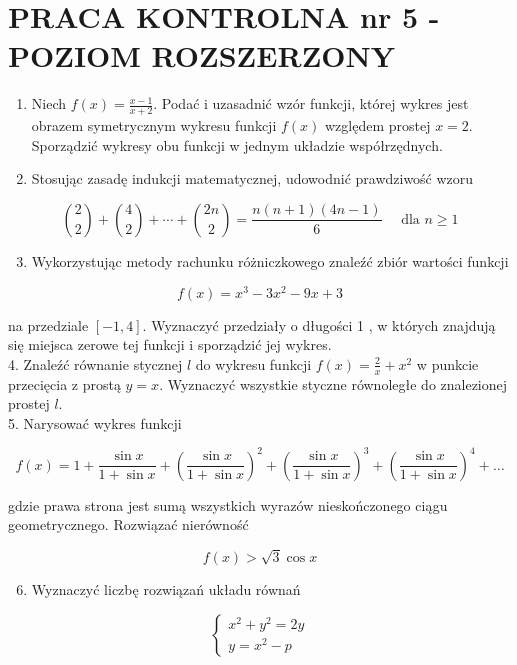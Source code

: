 \documentclass[10pt]{article}
\begin{document}
\section*{PRACA KONTROLNA nr 5 - POZIOM ROZSZERZONY}
\begin{enumerate}
  \item Niech $f(x)=\frac{x-1}{x+2}$. Podać i uzasadnić wzór funkcji, której wykres jest obrazem symetrycznym wykresu funkcji $f(x)$ względem prostej $x=2$. Sporządzić wykresy obu funkcji w jednym układzie współrzędnych.
  \item Stosując zasadę indukcji matematycznej, udowodnić prawdziwość wzoru
\end{enumerate}

$$
\binom{2}{2}+\binom{4}{2}+\cdots+\binom{2 n}{2}=\frac{n(n+1)(4 n-1)}{6} \quad \text { dla } n \geqslant 1
$$

\begin{enumerate}
  \setcounter{enumi}{2}
  \item Wykorzystując metody rachunku różniczkowego znaleźć zbiór wartości funkcji
\end{enumerate}

$$
f(x)=x^{3}-3 x^{2}-9 x+3
$$

na przedziale $[-1,4]$. Wyznaczyć przedziały o długości 1 , w których znajdują się miejsca zerowe tej funkcji i sporządzić jej wykres.\\
4. Znaleźć równanie stycznej $l$ do wykresu funkcji $f(x)=\frac{2}{x}+x^{2}$ w punkcie przecięcia z prostą $y=x$. Wyznaczyć wszystkie styczne równoległe do znalezionej prostej $l$.\\
5. Narysować wykres funkcji

$$
f(x)=1+\frac{\sin x}{1+\sin x}+\left(\frac{\sin x}{1+\sin x}\right)^{2}+\left(\frac{\sin x}{1+\sin x}\right)^{3}+\left(\frac{\sin x}{1+\sin x}\right)^{4}+\ldots
$$

gdzie prawa strona jest sumą wszystkich wyrazów nieskończonego ciągu geometrycznego. Rozwiązać nierówność

$$
f(x)>\sqrt{3} \cos x
$$

\begin{enumerate}
  \setcounter{enumi}{5}
  \item Wyznaczyć liczbę rozwiązań układu równań
\end{enumerate}

$$
\left\{\begin{array}{l}
x^{2}+y^{2}=2 y \\
y=x^{2}-p
\end{array}\right.
$$
\end{document}
